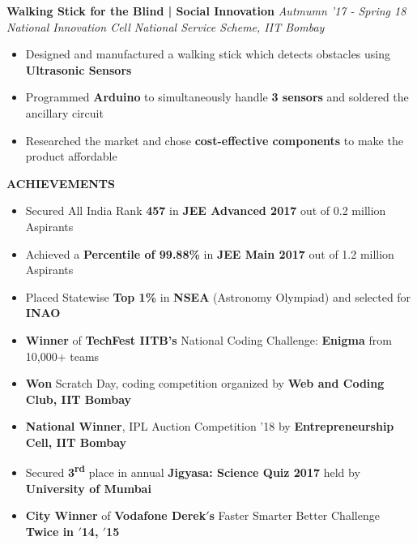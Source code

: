 \documentclass[11pt]{article}%
\begin{document}
{\flushleft \bf \large{Walking Stick for the Blind | Social Innovation}} \hfill {{{\em{Autmumn '17 - Spring 18}}}} \\
{\em{National Innovation Cell {\textbar} National Service Scheme, IIT Bombay}}
\vspace{-2mm}
\begin{itemize}
\setlength\itemsep{0.01em}
\item Designed and manufactured a walking stick which detects obstacles using {\bf Ultrasonic Sensors}
\vspace{-1.2mm}
\item Programmed {\bf Arduino} to simultaneously handle {\bf 3 sensors} and soldered the ancillary circuit
\vspace{-1.2mm}
\item Researched the market and chose {\bf cost-effective components} to make the product affordable
\end{itemize}
\vspace{-0.5cm}


\begin{flushleft}
\bf{\bf{\LARGE{A}\Large{CHIEVEMENTS}}}
\hrulefill
\end{flushleft}
\vspace{-4mm}
\vspace{-2mm}
\begin{itemize}
\setlength\itemsep{0.01em}
\item Secured All India Rank \textbf{457} in \textbf{JEE Advanced 2017} out of 0.2 million Aspirants
\vspace{-1mm}
\item Achieved a \textbf{Percentile of 99.88\%} in \textbf{JEE Main 2017} out of 1.2 million Aspirants
\vspace{-1mm}
\item Placed Statewise \textbf{Top 1\%} in \textbf{NSEA} (Astronomy Olympiad) and selected for {\bf INAO}
\vspace{-1mm}
    \item {\bf Winner} of {\bf TechFest IITB's} National Coding Challenge: {\bf Enigma} from 10,000+ teams  \vspace{-1mm}
    \item {\bf Won} Scratch Day, coding competition organized by {\bf Web and Coding Club, IIT Bombay}
    \vspace{-1mm}
    \item {\bf National Winner}, {IPL Auction Competition '18} by {\bf Entrepreneurship Cell, IIT Bombay}
    \vspace{-0.1cm}
    \item Secured {\bf 3\textsuperscript{rd}} place in annual {\bf Jigyasa: Science Quiz 2017} held by {\bf University of Mumbai}
    \vspace{-1mm}
    \item \textbf {\bf City Winner} of {\bf Vodafone Derek$'$s} Faster Smarter Better Challenge {\bf Twice in $'$14, $'$15}
\end{itemize}
\end{document}
